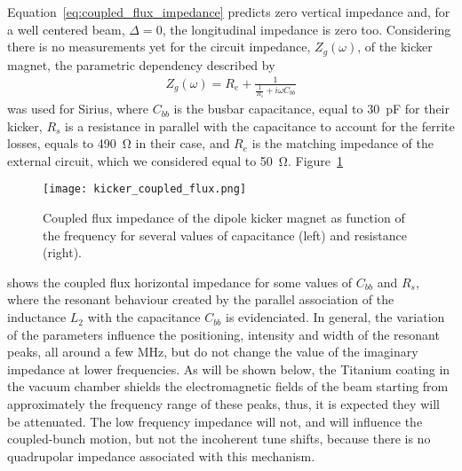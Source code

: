     Equation~\eqref{eq:coupled_flux_impedance} predicts zero vertical impedance and, for a well centered beam, $\Delta=0$, the longitudinal impedance is zero too. Considering there is no measurements yet for the circuit impedance, $Z_g(\omega)$, of the kicker magnet, the parametric dependency described by~
    \begin{align}
        Z_g(\omega) = R_e + \frac{1}{\frac{1}{R_s}+i\omega C_{bb}}
    \end{align}
    was used for Sirius, where $C_{bb}$ is the busbar capacitance, equal to \SI{30}{\pico\farad} for their kicker, $R_s$ is a resistance in parallel with the capacitance to account for the ferrite losses, equals to \SI{490}{\ohm} in their case, and $R_e$ is the matching impedance of the external circuit, which we considered equal to \SI{50}{\ohm}. Figure~\ref{fig:coupled_flux_impedance}
    \begin{figure}
        \centering
        \texttt{[image: kicker\_coupled\_flux.png]}
        \caption{Coupled flux impedance of the dipole kicker magnet as function of the frequency for several values of capacitance (left) and resistance (right).}
        \label{fig:coupled_flux_impedance}
    \end{figure}
    shows the coupled flux horizontal impedance for some values of $C_{bb}$ and $R_s$, where the resonant behaviour created by the parallel association of the inductance $L_2$ with the capacitance $C_{bb}$ is evidenciated. In general, the variation of the parameters influence the positioning, intensity and width of the resonant peaks, all around a few \si{\mega\hertz}, but do not change the value of the imaginary impedance at lower frequencies. As will be shown below, the Titanium coating in the vacuum chamber shields the electromagnetic fields of the beam starting from approximately the frequency range of these peaks, thus, it is expected they will be attenuated. The low frequency impedance will not, and will influence the coupled-bunch motion, but not the incoherent tune shifts, because there is no quadrupolar impedance associated with this mechanism.

